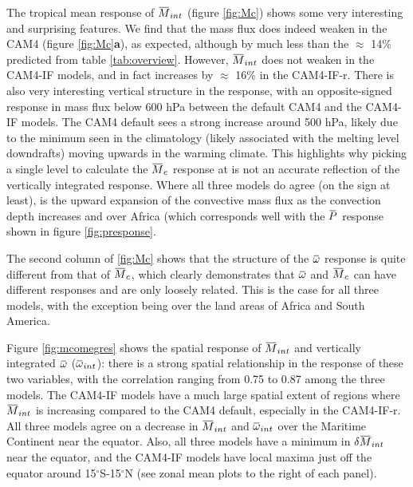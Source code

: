 \documentclass[letterpaper,12pt,titlepage,oneside,final]{book}
\newcommand{\overbar}[1]{\mkern 1.5mu\overline{\mkern-1.5mu#1\mkern-1.5mu}\mkern 1.5mu}
\begin{document}
The tropical mean response of $\overbar{M}_{int}$ (figure \ref{fig:Mc}) shows some very interesting and surprising features. We find that the mass flux does indeed weaken in the CAM4 (figure \ref{fig:Mc}\textbf{a}), as expected, although by much less than the $\approx$ 14\% predicted from table \ref{tab:overview}. However, $\overbar{M}_{int}$ does not weaken in the CAM4-IF models, and in fact increases by $\approx$ 16\% in the CAM4-IF-r. There is also very interesting vertical structure in the response, with an opposite-signed response in mass flux below 600 hPa between the default CAM4 and the CAM4-IF models. The CAM4 default sees a strong increase around 500 hPa, likely due to the minimum seen in the climatology (likely associated with the melting level downdrafts) moving upwards in the warming climate. This highlights why picking a single level to calculate the $\overbar{M}_{c}$ response at is not an accurate reflection of the vertically integrated response. Where all three models do agree (on the sign at least), is the upward expansion of the convective mass flux as the convection depth increases and over Africa (which corresponds well with the $\overbar{P}$ response shown in figure \ref{fig:presponse}. 

The second column of \ref{fig:Mc} shows that the structure of the $\overbar{\omega}$ response is quite different from that of $\overbar{M}_{c}$, which clearly demonstrates that $\overbar{\omega}$ and $\overbar{M}_{c}$ can have different responses and are only loosely related. This is the case for all three models, with the exception being over the land areas of Africa and South America. 

Figure \ref{fig:mcomegres} shows the spatial response of $\overbar{M}_{int}$ and vertically integrated $\overbar{\omega}$ ($\overbar{\omega}_{int}$): there is a strong spatial relationship in the response of these two variables, with the correlation ranging from 0.75 to 0.87 among the three models. The CAM4-IF models have a much large spatial extent of regions where $\overbar{M}_{int}$ is increasing compared to the CAM4 default, especially in the CAM4-IF-r. All three models agree on a decrease in $\overbar{M}_{int}$ and $\overbar{\omega}_{int}$ over the Maritime Continent near the equator. Also, all three models have a minimum in $\delta\overbar{M}_{int}$ near the equator, and the CAM4-IF models have local maxima just off the equator around 15$^{\circ}$S-15$^{\circ}$N (see zonal mean plots to the right of each panel).
\end{document}
